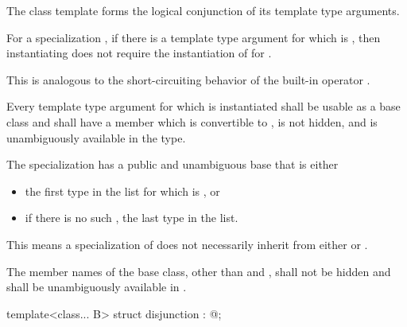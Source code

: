 \begin{itemdescr}
\pnum
The class template 
forms the logical conjunction of its template type arguments.

\pnum
For a specialization ,
if there is a template type argument  for which  is ,
then instantiating 
does not require the instantiation of  for .
\begin{note} This is analogous to the short-circuiting behavior of
the built-in operator \tcode{\&\&}.
\end{note}

\pnum
Every template type argument
for which  is instantiated
shall be usable as a base class and
shall have a member  which
is convertible to ,
is not hidden, and
is unambiguously available in the type.

\pnum
The specialization 
has a public and unambiguous base that is either
\begin{itemize}
\item
the first type  in the list 
for which  is , or
\item
if there is no such , the last type in the list.
\end{itemize}
\begin{note} This means a specialization of 
does not necessarily inherit from
either  or .
\end{note}

\pnum
The member names of the base class, other than  and
, shall not be hidden and shall be unambiguously available
in .
\end{itemdescr}

%
\begin{itemdecl}
template<class... B> struct disjunction : @\seebelow@ { };
\end{itemdecl}

